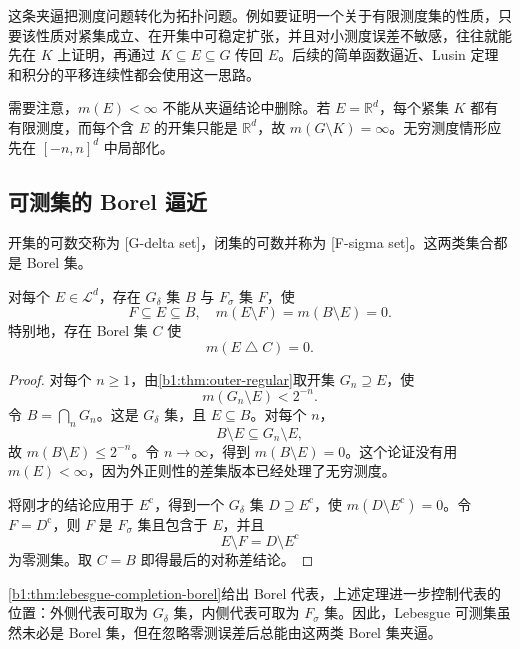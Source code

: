 这条夹逼把测度问题转化为拓扑问题。例如要证明一个关于有限测度集的性质，只要该性质对紧集成立、在开集中可稳定扩张，并且对小测度误差不敏感，往往就能先在 \(K\) 上证明，再通过 \(K\subseteq E\subseteq G\) 传回 \(E\)。后续的简单函数逼近、Lusin 定理和积分的平移连续性都会使用这一思路。

\ProseParagraphBreak

需要注意，\(m(E)<\infty\) 不能从夹逼结论中删除。若 \(E=\mathbb R^d\)，每个紧集 \(K\) 都有有限测度，而每个含 \(E\) 的开集只能是 \(\mathbb R^d\)，故 \(m(G\setminus K)=\infty\)。无穷测度情形应先在 \([-n,n]^d\) 中局部化。

\subsection{可测集的 Borel 逼近}
\label{b1:subsec:030304}

开集的可数交称为 [G-delta set]，闭集的可数并称为 [F-sigma set]。这两类集合都是 Borel 集。

\begin{theorem}
\label{b1:thm:borel-approximation}
对每个 \(E\in\mathcal L^d\)，存在 \(G_\delta\) 集 \(B\) 与 \(F_\sigma\) 集 \(F\)，使
\[
F\subseteq E\subseteq B,
\quad
m(E\setminus F)=m(B\setminus E)=0.
\]
特别地，存在 Borel 集 \(C\) 使
\[
m(E\mathbin{\triangle}C)=0.
\]
\end{theorem}
\begin{proof}
对每个 \(n\geq1\)，由\cref{b1:thm:outer-regular}取开集 \(G_n\supseteq E\)，使
\[
m(G_n\setminus E)<2^{-n}.
\]
令 \(B=\bigcap_nG_n\)。这是 \(G_\delta\) 集，且 \(E\subseteq B\)。对每个 \(n\)，
\[
B\setminus E\subseteq G_n\setminus E,
\]
故 \(m(B\setminus E)\leq2^{-n}\)。令 \(n\to\infty\)，得到 \(m(B\setminus E)=0\)。这个论证没有用 \(m(E)<\infty\)，因为外正则性的差集版本已经处理了无穷测度。

将刚才的结论应用于 \(E^{\mathrm c}\)，得到一个 \(G_\delta\) 集 \(D\supseteq E^{\mathrm c}\)，使
\(m(D\setminus E^{\mathrm c})=0\)。令 \(F=D^{\mathrm c}\)，则 \(F\) 是 \(F_\sigma\) 集且包含于 \(E\)，并且
\[
E\setminus F=D\setminus E^{\mathrm c}
\]
为零测集。取 \(C=B\) 即得最后的对称差结论。
\end{proof}

\cref{b1:thm:lebesgue-completion-borel}给出 Borel 代表，上述定理进一步控制代表的位置：外侧代表可取为 \(G_\delta\) 集，内侧代表可取为 \(F_\sigma\) 集。因此，Lebesgue 可测集虽然未必是 Borel 集，但在忽略零测误差后总能由这两类 Borel 集夹逼。

